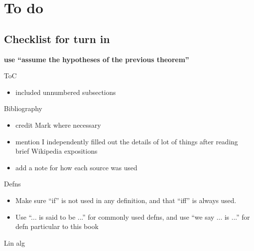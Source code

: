 \chapter*{To do}

\section*{Checklist for turn in}

\textbf{use ``assume the hypotheses of the previous theorem''}

ToC
\begin{itemize}
    \item included unnumbered subsections
\end{itemize}

Bibliography
\begin{itemize}
    \item credit Mark where necessary
    \item mention I independently filled out the details of lot of things after reading brief Wikipedia expositions
    \item add a note for how each source was used
\end{itemize}

Defns
\begin{itemize}
    \item Make sure ``if'' is not used in any definition, and that ``iff'' is always used.
    \item Use ``... is said to be ...'' for commonly used defns, and use ``we say ... is ...'' for defn particular to this book
\end{itemize}

Lin alg

